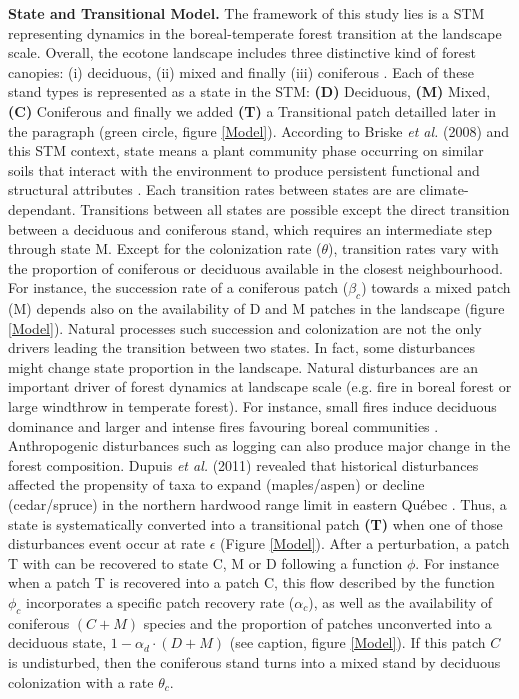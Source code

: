 \textbf{State and Transitional Model.} The framework of this study lies is a
STM representing dynamics in the boreal-temperate forest transition at the
landscape scale. Overall, the ecotone landscape includes three distinctive
kind of forest canopies: (i) deciduous, (ii) mixed and finally (iii)
coniferous \cite{Fisichelli2013}. Each of these stand types is represented as
a state in the STM: \textbf{(D)} Deciduous, \textbf{(M)} Mixed, \textbf{(C)}
Coniferous and finally we added \textbf{(T)} a Transitional patch detailled
later in the paragraph (green circle, figure \ref{Model}). According to
Briske\textit{ et al.} (2008) and this STM context, state means a plant
community phase occurring on similar soils that interact with the environment
to produce persistent functional and structural attributes \cite{Briske2008}.
Each transition rates between states are are climate-dependant. Transitions
between all states are possible except the direct transition between a
deciduous and coniferous stand, which requires an intermediate step through
state M. Except for the colonization rate ($\theta$), transition rates vary
with the proportion of coniferous or deciduous available in the closest
neighbourhood. For instance, the succession rate of a coniferous patch
($\beta_c$) towards a mixed patch (M) depends also on the availability of D
and M patches in the landscape (figure \ref{Model}). Natural processes such
succession and colonization are not the only drivers leading the transition
between two states. In fact, some disturbances might change state proportion
in the landscape. Natural disturbances are an important driver of forest
dynamics at landscape scale (e.g. fire in boreal forest or large windthrow in
temperate forest). For instance, small fires induce deciduous dominance and
larger and intense fires favouring boreal communities \cite{Bergeron2004}.
Anthropogenic disturbances such as logging can also produce major change in
the forest composition. Dupuis \textit{et al.} (2011) revealed that historical
disturbances affected the propensity of taxa to expand (maples/aspen) or
decline (cedar/spruce) in the northern hardwood range limit in eastern Québec
\cite{Dupuis2011}. Thus, a state is systematically converted into a
transitional patch \textbf{(T)} when one of those disturbances event occur at
rate $\epsilon$ (Figure \ref{Model}). After a perturbation, a patch T with can
be recovered to state C, M or D following a function $\phi$. For instance when
a patch T is recovered into a patch C, this flow described by the function
$\phi_c$ incorporates a specific patch recovery rate ($\alpha_c$), as well as
the availability of coniferous $(C + M)$ species and the proportion of patches
unconverted into a deciduous state, $1- \alpha_d \cdot (D + M)$ (see caption,
figure \ref{Model}). If this patch $C$ is undisturbed, then the coniferous
stand turns into a mixed stand by deciduous colonization with a rate
$\theta_c$.

